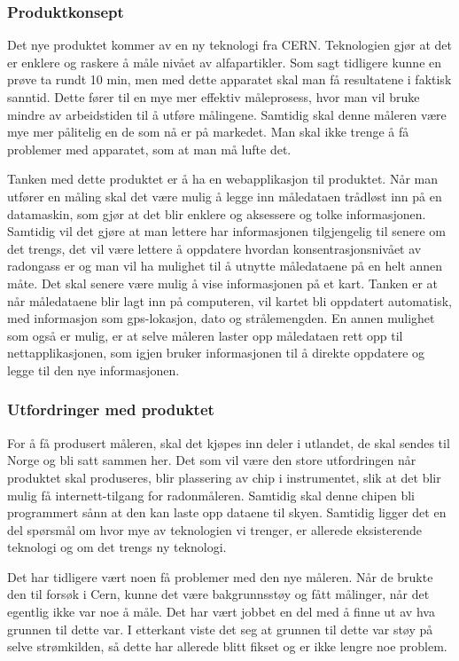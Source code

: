 \subsubsection{Produktkonsept}

Det nye produktet kommer av en ny teknologi fra CERN. Teknologien gjør at det er enklere og raskere å måle nivået av alfapartikler. Som sagt tidligere kunne en prøve ta rundt 10 min, men med dette apparatet skal man få resultatene i faktisk sanntid. Dette fører til en mye mer effektiv måleprosess, hvor man vil bruke mindre av arbeidstiden til å utføre målingene. Samtidig skal denne måleren være mye mer pålitelig en de som nå er på markedet. Man skal ikke trenge å få problemer med apparatet, som at man må lufte det.	

Tanken med dette produktet er å ha en webapplikasjon til produktet. Når man utfører en måling skal det være mulig å legge inn måledataen trådløst inn på en datamaskin, som gjør at det blir enklere og aksessere og tolke informasjonen. Samtidig vil det gjøre at man lettere har informasjonen tilgjengelig til senere om det trengs, det vil være lettere å oppdatere hvordan konsentrasjonsnivået av radongass er og man vil ha mulighet til å utnytte måledataene på en helt annen måte. Det skal senere være mulig å vise informasjonen på et kart. Tanken er at når måledataene blir lagt inn på computeren, vil kartet bli oppdatert automatisk, med informasjon som gps-lokasjon, dato og strålemengden. En annen mulighet som også er mulig, er at selve måleren laster opp måledataen rett opp til nettapplikasjonen, som igjen bruker informasjonen til å direkte oppdatere og legge til den nye informasjonen.

\subsubsection{Utfordringer med produktet}

For å få produsert måleren, skal det kjøpes inn deler i utlandet, de skal sendes til Norge og bli satt sammen her. Det som vil være den store utfordringen når produktet skal produseres, blir plassering av chip i instrumentet, slik at det blir mulig få internett-tilgang for radonmåleren. Samtidig skal denne chipen bli programmert sånn at den kan laste opp dataene til skyen. Samtidig ligger det en del spørsmål om hvor mye av teknologien vi trenger, er allerede eksisterende teknologi og om det trengs ny teknologi.

Det har tidligere vært noen få problemer med den nye måleren. Når de brukte den til forsøk i Cern, kunne det være bakgrunnsstøy og fått målinger, når det egentlig ikke var noe å måle. Det har vært jobbet en del med å finne ut av hva grunnen til dette var. I etterkant viste det seg at grunnen til dette var støy på selve strømkilden, så dette har allerede blitt fikset og er ikke lengre noe problem.

